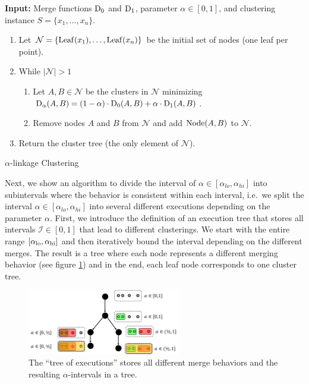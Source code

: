 \begin{algorithm}
\textbf{Input:} Merge functions $\operatorname{D_{0}}$ and $\operatorname{D_{1}}$, parameter $\alpha \in [0,1]$, and clustering instance $S = \{x_1, \dots, x_n\}$.
\begin{enumerate}[nosep, leftmargin=*]
\item Let $\mathcal{N} = \{\operatorname{Leaf}(x_1), \dots, \operatorname{Leaf}(x_n)\}$ be the initial set of nodes (one leaf per point).
\item While $|\mathcal{N}| > 1$
\begin{enumerate}[nosep, leftmargin=*]
  \item Let $A, B \in \mathcal{N}$ be the clusters in $\mathcal{N}$ minimizing $\operatorname{D_{\alpha}}(A,B) = (1-\alpha)\cdot \operatorname{D_{0}}(A,B) + \alpha \cdot \operatorname{D_{1}}(A,B)$.
  \item Remove nodes $A$ and $B$ from $\mathcal{N}$ and add $\operatorname{Node}(A,B)$ to $\mathcal{N}$.
\end{enumerate}
\item Return the cluster tree (the only element of $\mathcal{N}$).
\end{enumerate}
\caption{$\alpha$-linkage Clustering}
\label{alg:alphalinkage}
\end{algorithm}

 Next, we show an algorithm to divide the interval of $\alpha \in [\alpha_{lo}, \alpha_{hi}]$ into subintervals where the behavior is consistent within each interval, i.e.\ we split the interval $\alpha \in [\alpha_{lo}, \alpha_{hi}]$ into several different executions depending on the parameter $\alpha$. First, we introduce the definition of an execution tree that stores all intervals $\mathcal{I} \in [0,1]$ that lead to different clusterings. We start with the entire range $[\alpha_\text{lo}, \alpha_\text{hi}]$ and then iteratively bound the interval depending on the different merges. The result is a tree where each node represents a different merging behavior (see figure \ref{fig:toe}) and in the end, each leaf node corresponds to one cluster tree.

 \begin{figure}[h]
    \centering
    \includegraphics[width=0.6\textwidth]{images/ClusterTreeFigure}
    \caption{The ``tree of executions'' stores all different merge behaviors and the resulting $\alpha$-intervals in a tree.}
    \label{fig:toe}
\end{figure}

